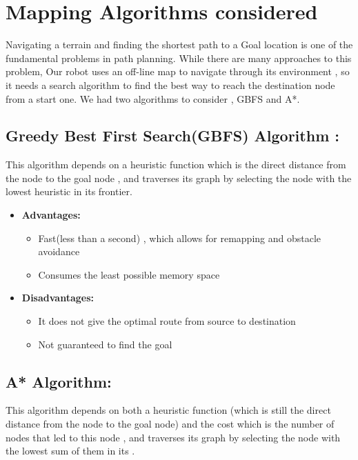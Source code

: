 \documentclass[12pt]{book}
\begin{document}
\section{Mapping Algorithms considered}
Navigating a terrain and finding the shortest path to a Goal location is one of the fundamental problems in path planning. While there are many approaches to this problem, Our robot uses an off-line map to navigate through its environment , so it needs a search algorithm to find the best way to reach the destination node from a start one. We had two algorithms to consider , GBFS and A*.

\subsection{Greedy Best First Search(GBFS) Algorithm :}
This algorithm depends on a heuristic function which is the direct distance from the node to the goal node , and traverses its graph by selecting the node with the lowest heuristic in its frontier.

\begin{itemize}
	\item \textbf{Advantages:}
		\begin{itemize}
			\item Fast(less than a second) , which allows for remapping and obstacle avoidance
			\item Consumes the least possible memory space
			
		\end{itemize}
	\item \textbf{Disadvantages:}
		\begin{itemize}
			\item It does not give the optimal route from source to destination
			\item Not guaranteed to find the goal
			
		\end{itemize}
\end{itemize}

\subsection{A* Algorithm:}
This algorithm depends on both a heuristic function (which is still the direct distance from the node to the goal node) and the cost which is the number of nodes that led to this node , and traverses its graph by selecting the node with the lowest sum of them in its .
\end{document}
